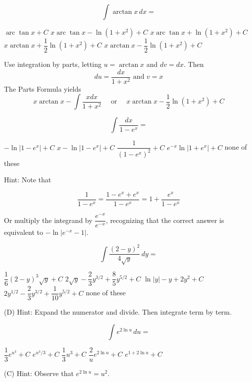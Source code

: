 \question
\[
\displaystyle\int \arctan x \,dx=
\]
\begin{choices}
  \choice $\operatorname{arc} \tan x+C$
  \choice $x \operatorname{arc} \tan x-\ln \left(1+x^{2}\right)+C$
  \choice $x \operatorname{arc} \tan x+\ln \left(1+x^{2}\right)+C$
  \choice $x \arctan x+\dfrac{1}{2} \ln \left(1+x^{2}\right)+C$
  \CorrectChoice $x \arctan x-\dfrac{1}{2} \ln \left(1+x^{2}\right)+C$
\end{choices}
\begin{solution}
Use integration by parts, letting $u=\arctan x$ and $d v=d x$. Then
\[
d u=\dfrac{d x}{1+x^{2}} \text { and } v=x
\]
The Parts Formula yields
\[
x \arctan x-\displaystyle\int \dfrac{x d x}{1+x^{2}} \quad \text { or } \quad x \arctan x-\dfrac{1}{2} \ln \left(1+x^{2}\right)+C
\]
\end{solution}


\newpage




\question
\[
\displaystyle\int \dfrac{d x}{1-e^{x}}=
\]
\begin{choices}
  \choice $-\ln \left|1-e^{x}\right|+C$
  \CorrectChoice $x-\ln \left|1-e^{x}\right|+C$
  \choice $\dfrac{1}{\left(1-e^{x}\right)^{2}}+C$
  \choice $e^{-x} \ln \left|1+e^{x}\right|+C$
  \choice none of these
\end{choices}
\begin{solution}
Hint: Note that


\[
\dfrac{1}{1-e^{x}}=\dfrac{1-e^{x}+e^{x}}{1-e^{x}}=1+\dfrac{e^{x}}{1-e^{x}}
\]

Or multiply the integrand by $\dfrac{e^{-x}}{e^{-x}}$, recognizing that the correct answer is equivalent to $-\ln \left|e^{-x}-1\right|$.
\end{solution}

\question
\[
\displaystyle\int \dfrac{(2-y)^{2}}{4 \sqrt{y}} \,dy=
\]
\begin{choices}
  \choice $\dfrac{1}{6}(2-y)^{3} \sqrt{y}+C$
  \choice $2 \sqrt{y}-\dfrac{2}{3} y^{3 / 2}+\dfrac{8}{5} y^{5 / 2}+C$
  \choice $\ln |y|-y+2 y^{2}+C$
  \CorrectChoice $2 y^{1 / 2}-\dfrac{2}{3} y^{3 / 2}+\dfrac{1}{10} y^{5 / 2}+C$
  \choice none of these
\end{choices}
\begin{solution}
(D) Hint: Expand the numerator and divide. Then integrate term by term.
\end{solution}

\question
\[
\displaystyle\int e^{2 \ln u} \,du=
\]
\begin{choices}
  \choice $\dfrac{1}{3} e^{u^{3}}+C$
  \choice $e^{u^{3} / 3}+C$
  \CorrectChoice $\dfrac{1}{3} u^{3}+C$
  \choice $\dfrac{2}{u} e^{2 \ln u}+C$
  \choice $e^{1+2 \ln u}+C$
\end{choices}
\begin{solution}
(C) Hint: Observe that $e^{2 \ln u}=u^{2}$.
\end{solution}



